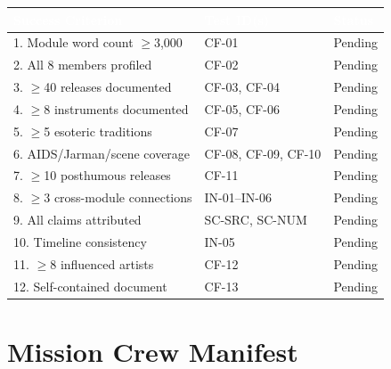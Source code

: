 \documentclass[11pt,letterpaper]{article}
\newcommand{\tableheader}[1]{\textbf{\sffamily\textcolor{white}{#1}}}
\begin{document}
\begin{center}
\begin{tabularx}{\textwidth}{XL{3cm}C{1.5cm}}
\toprule
{}
\tableheader{Success Criterion} & \tableheader{Test ID(s)} & \tableheader{Status} \\
. Module word count $\geq$3,000 & CF-01 & Pending \\
2. All 8 members profiled & CF-02 & Pending \\
3. $\geq$40 releases documented & CF-03, CF-04 & Pending \\
4. $\geq$8 instruments documented & CF-05, CF-06 & Pending \\
5. $\geq$5 esoteric traditions & CF-07 & Pending \\
6. AIDS/Jarman/scene coverage & CF-08, CF-09, CF-10 & Pending \\
7. $\geq$10 posthumous releases & CF-11 & Pending \\
8. $\geq$3 cross-module connections & IN-01--IN-06 & Pending \\
9. All claims attributed & SC-SRC, SC-NUM & Pending \\
10. Timeline consistency & IN-05 & Pending \\
11. $\geq$8 influenced artists & CF-12 & Pending \\
12. Self-contained document & CF-13 & Pending \\
\bottomrule
\end{tabularx}
\end{center}

\section{Mission Crew Manifest}
\end{document}
